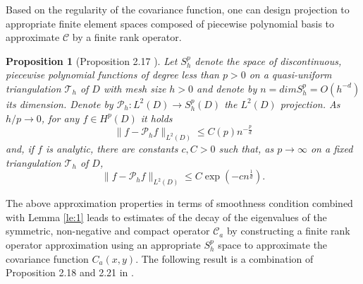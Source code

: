 \documentclass[11pt]{amsart}
\newtheorem{definition}{Definition}[section]
\newtheorem{proposition}{Proposition}[section]
\begin{document}

Based on the regularity of the covariance function, one can design projection to appropriate finite element spaces composed of piecewise polynomial basis to approximate $\mathcal{C}$ by a finite rank operator. 

\begin{proposition}[Proposition 2.17  \cite{schwab2006karhunen}]
\label{prop:proj}
Let $S_h^p$ denote the space of discontinuous, piecewise polynomial functions of degree less than $p>0$ on a quasi-uniform triangulation $\mathcal{T}_h$ of $D$ with mesh size $h>0$ and denote by $n=dim S_h^p=O(h^{-d})$ its dimension. Denote by $\mathcal{P}_h: L^2(D)\rightarrow S_h^p(D)$ the $L^2(D)$ projection. As $h/p\rightarrow 0$, for any $f \in H^p(D)$ it holds
\begin{equation}
\label{eq:Hp}
\|f-\mathcal{P}_hf\|_{L^2(D)}\le C(p)n^{-\frac{p}{d}}
\end{equation}
and, if $f$ is analytic, there are constants $c, C >0$ such that, as $p\rightarrow \infty$ on a fixed triangulation $\mathcal{T}_h$ of $D$,
\begin{equation}
\|f-\mathcal{P}_hf\|_{L^2(D)}\le C\exp(-cn^{\frac{1}{d}}).
\end{equation}
\end{proposition}

The above approximation properties in terms of smoothness condition combined with Lemma \ref{le:1}
leads to estimates of the decay of the eigenvalues of the symmetric, non-negative and compact operator $\mathcal{C}_a$ by constructing a finite rank operator approximation using an appropriate $S_h^p$ space to approximate the covariance function $C_a(x,y)$. The following result is a combination of Proposition 2.18 and 2.21 in  \cite{schwab2006karhunen}.
\end{document}
